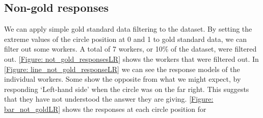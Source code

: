 \subsection{Non-gold responses}

We can apply simple gold standard data filtering to the dataset. 
By setting the extreme values of the circle position at 0 and 1 to gold standard data, we can filter out some workers. 
A total of 7 workers, or 10\% of the dataset, were filtered out. 
\ref{Figure: not_gold_responsesLR} shows the workers that were filtered out. 
In \ref{Figure: line_not_gold_responseLR} we can see the response models of the individual workers. 
Some show the opposite from what we might expect, by responding `Left-hand side' when the circle was on the far right. 
This suggests that they have not understood the answer they are giving. 
\ref{Figure: bar_not_goldLR} shows the responses at each circle position for 


